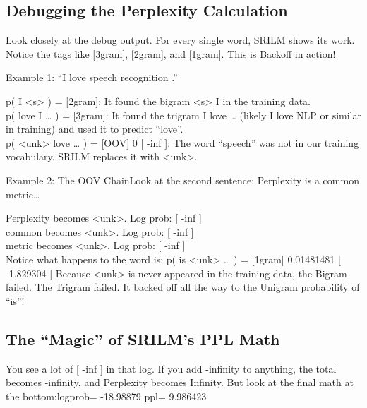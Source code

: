 \documentclass[11pt]{article}
\begin{document}
    \hypertarget{debugging-the-perplexity-calculation}{%
\subsection{Debugging the Perplexity
Calculation}\label{debugging-the-perplexity-calculation}}

Look closely at the debug output. For every single word, SRILM shows its
work. Notice the tags like {[}3gram{]}, {[}2gram{]}, and {[}1gram{]}.
This is Backoff in action!

Example 1: ``I love speech recognition .''

p( I \textbar{} \textless s\textgreater{} ) = {[}2gram{]}: It found the
bigram \textless s\textgreater{} I in the training data.\\
p( love \textbar{} I \ldots{} ) = {[}3gram{]}: It found the trigram I
love \ldots{} (likely I love NLP or similar in training) and used it to
predict ``love''.\\
p( \textless unk\textgreater{} \textbar{} love \ldots{} ) = {[}OOV{]} 0
{[} -inf {]}: The word ``speech'' was not in our training vocabulary.
SRILM replaces it with \textless unk\textgreater.

Example 2: The OOV ChainLook at the second sentence: Perplexity is a
common metric\ldots{}

Perplexity becomes \textless unk\textgreater. Log prob: {[} -inf {]}\\
common becomes \textless unk\textgreater. Log prob: {[} -inf {]}\\
metric becomes \textless unk\textgreater. Log prob: {[} -inf {]}\\
Notice what happens to the word is: p( is \textbar{}
\textless unk\textgreater{} \ldots{} ) = {[}1gram{]} 0.01481481 {[}
-1.829304 {]} Because \textless unk\textgreater{} is never appeared in
the training data, the Bigram failed. The Trigram failed. It backed off
all the way to the Unigram probability of ``is''!

    \hypertarget{the-magic-of-srilms-ppl-math}{%
\subsection{The ``Magic'' of SRILM's PPL
Math}\label{the-magic-of-srilms-ppl-math}}

You see a lot of {[} -inf {]} in that log. If you add -infinity to
anything, the total becomes -infinity, and Perplexity becomes Infinity.
But look at the final math at the bottom:logprob= -18.98879 ppl=
9.986423
\end{document}
